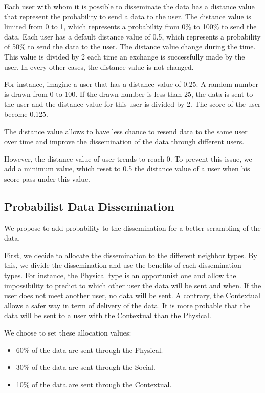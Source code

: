 Each user with whom it is possible to disseminate the data has a distance value that represent the probability to send a data to the user.
The distance value is limited from 0 to 1, which represents a probability from 0\% to 100\% to send the data.
Each user has a default distance value of 0.5, which represents a probability of 50\% to send the data to the user.
The distance value change during the time.
This value is divided by 2 each time an exchange is successfully made by the user.
In every other cases, the distance value is not changed.

For instance, imagine a user that has a distance value of 0.25. 
A random number is drawn from 0 to 100.
If the drawn number is less than 25, the data is sent to the user and the distance value for this user is divided by 2.
The score of the user become 0.125.

The distance value allows to have less chance to resend data to the same user over time and improve the dissemination of the data through different users.

However, the distance value of user trends to reach 0.
To prevent this issue, we add a minimum value, which reset to 0.5 the distance value of a user when his score pass under this value.

\subsection{Probabilist Data Dissemination}

We propose to add probability to the dissemination for a better scrambling of the data.

First, we decide to allocate the dissemination to the different neighbor types.
By this, we divide the dissemination and use the benefits of each dissemination types.
For instance, the Physical type is an opportunist one and allow the impossibility to predict to which other user the data will be sent and when.
If the user does not meet another user, no data will be sent.
A contrary, the Contextual allows a safer way in term of delivery of the data.
It is more probable that the data will be sent to a user with the Contextual than the Physical.

We choose to set these allocation values:
\begin{itemize}
    \item 60\% of the data are sent through the Physical.
    \item 30\% of the data are sent through the Social.
    \item 10\% of the data are sent through the Contextual.
\end{itemize}

